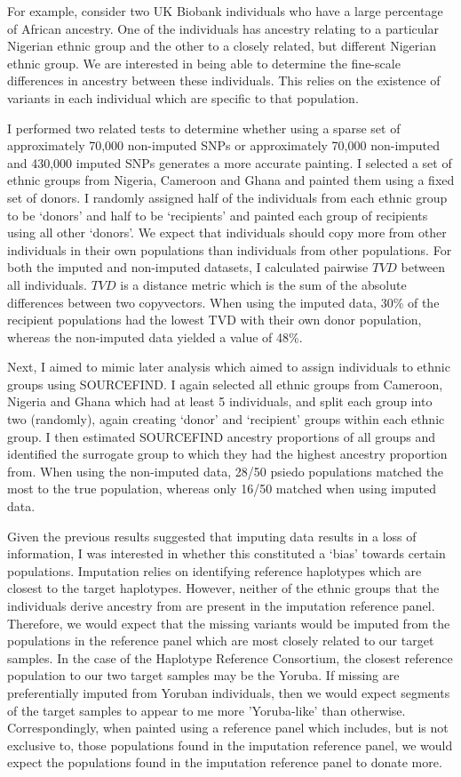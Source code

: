 For example, consider two UK Biobank individuals who have a large percentage of African ancestry. One of the individuals has ancestry relating to a particular Nigerian ethnic group and the other to a closely related, but different Nigerian ethnic group. We are interested in being able to determine the fine-scale differences in ancestry between these individuals. This relies on the existence of variants in each individual which are specific to that population.

I performed two related tests to determine whether using a sparse set of approximately 70,000 non-imputed SNPs or approximately 70,000 non-imputed and 430,000 imputed SNPs generates a more accurate painting. I selected a set of ethnic groups from Nigeria, Cameroon and Ghana and painted them using a fixed set of donors. I randomly assigned half of the individuals from each ethnic group to be `donors' and half to be `recipients' and painted each group of recipients using all other `donors'. We expect that individuals should copy more from other individuals in their own populations than individuals from other populations. For both the imputed and non-imputed datasets, I calculated pairwise $TVD$ between all individuals. $TVD$ is a distance metric which is the sum of the absolute differences between two copyvectors. When using the imputed data, 30\% of the recipient populations had the lowest TVD with their own donor population, whereas the non-imputed data yielded a value of 48\%. 

Next, I aimed to mimic later analysis which aimed to assign individuals to ethnic groups using SOURCEFIND. I again selected all ethnic groups from Cameroon, Nigeria and Ghana which had at least 5 individuals, and split each group into two (randomly), again creating `donor' and `recipient' groups within each ethnic group. I then estimated SOURCEFIND ancestry proportions of all groups and identified the surrogate group to which they had the highest ancestry proportion from. When using the non-imputed data, 28/50 psiedo populations matched the most to the true population, whereas only 16/50 matched when using imputed data. 


Given the previous results suggested that imputing data results in a loss of information, I was interested in whether this constituted a `bias' towards certain populations. Imputation relies on identifying reference haplotypes which are closest to the target haplotypes. However, neither of the ethnic groups that the individuals derive ancestry from are present in the imputation reference panel. Therefore, we would expect that the missing variants would be imputed from the populations in the reference panel which are most closely related to our target samples. In the case of the Haplotype Reference Consortium, the closest reference population to our two target samples may be the Yoruba. If missing are preferentially imputed from Yoruban individuals, then we would expect segments of the target samples to appear to me more 'Yoruba-like' than otherwise. Correspondingly, when painted using a reference panel which includes, but is not exclusive to, those populations found in the imputation reference panel, we would expect the populations found in the imputation reference panel to donate more.

